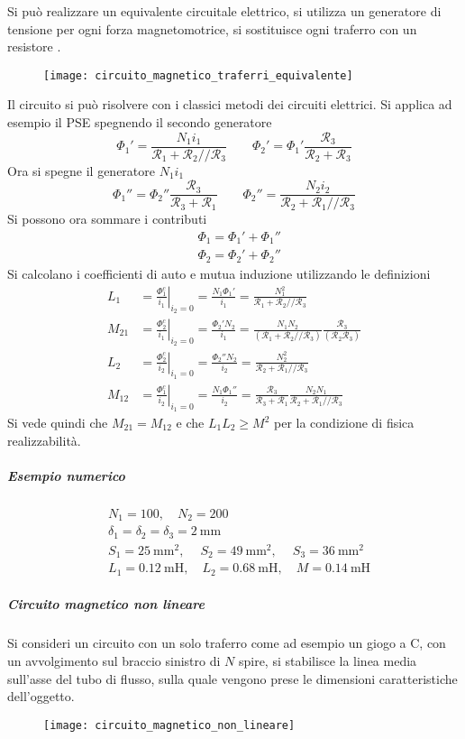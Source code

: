 Si può realizzare un equivalente circuitale elettrico, si utilizza un generatore
di tensione per ogni forza magnetomotrice, si sostituisce ogni traferro con un resistore
.
\begin{figure}[H]
\centering
\texttt{[image: circuito\_magnetico\_traferri\_equivalente]}
\end{figure}
Il circuito si può risolvere con i classici metodi dei circuiti elettrici.
Si applica ad esempio il PSE spegnendo il secondo generatore
$$
\Phi_1' = \frac{N_1i_1}{\mathcal{R}_1 + \mathcal{R}_2 // \mathcal{R}_3}
\qquad
\Phi_2' = \Phi_1' \frac{\mathcal{R}_3}{\mathcal{R}_2+\mathcal{R}_3}
$$
Ora si spegne il generatore $N_1i_1$
$$
\Phi_1'' = \Phi_2'' \frac{\mathcal{R}_3}{\mathcal{R}_3 + \mathcal{R}_1}
\qquad
\Phi_2'' = \frac{N_2i_2}{\mathcal{R}_2+\mathcal{R}_1//\mathcal{R}_3}
$$
Si possono ora sommare i contributi
\begin{align*}
&\Phi_1 = \Phi_1' + \Phi_1''\\
&\Phi_2 = \Phi_2' + \Phi_2''
\end{align*}
Si calcolano i coefficienti di auto e mutua induzione utilizzando le definizioni
\begin{align*}
L_1 &= \left.\frac{\Phi_1^c}{i_1}\right|_{i_2 = 0} = \frac{N_1\Phi_1'}{i_1} = \frac{N_1^2}{\mathcal{R}_1 + \mathcal{R}_2//\mathcal{R}_3}\\
M_{21} &= \left.\frac{\Phi_2^c}{i_1}\right|_{i_2 = 0} = \frac{\Phi_2' N_2}{i_1} =
\frac{N_1N_2}{(\mathcal{R}_1+\mathcal{R}_2//\mathcal{R}_3)}\frac{\mathcal{R}_3}{(\mathcal{R}_2\mathcal{R}_3)}\\
L_2 &= \left.\frac{\Phi_2^c}{i_2}\right|_{i_1 = 0} = \frac{\Phi_2''N_2}{i_2} = \frac{N_2^2}{\mathcal{R}_2+\mathcal{R}_1//\mathcal{R}_3}\\
M_{12} &= \left.\frac{\Phi_1^c}{i_2}\right|_{i_1 = 0} = \frac{N_1\Phi_1''}{i_2} = \frac{\mathcal{R}_3}{\mathcal{R}_3+\mathcal{R}_1}\frac{N_2N_1}{\mathcal{R}_2+\mathcal{R}_1//\mathcal{R}_3}
\end{align*}
Si vede quindi che $M_{21} = M_{12}$ e che $L_1L_2 \geq M^2$ per la condizione di fisica
realizzabilità.
\newpage
\subparagraph{Esempio numerico}
\begin{align*}
&N_1 = 100, \quad N_2 = 200\\
&\delta_1 = \delta_2=\delta_3 = \SI{2}{\milli\meter} \\
& S_1 = \SI{25}{\milli\meter^2},\quad\ S_2 = \SI{49}{\milli\meter^2},\quad\ S_3 = \SI{36}{\milli\meter^2}\\
&L_1 = \SI{0.12}{\milli\henry},\quad L_2 = \SI{0.68}{\milli\henry}, \quad  M = \SI{0.14}{\milli\henry}
\end{align*}
\subparagraph{Circuito magnetico non lineare}
Si consideri un circuito con un solo traferro come ad esempio un giogo a C, con un avvolgimento sul braccio sinistro di $N$ spire, si stabilisce la linea media sull'asse
del tubo di flusso, sulla quale vengono prese le dimensioni caratteristiche dell'oggetto.
\begin{figure}[H]
\centering
\texttt{[image: circuito\_magnetico\_non\_lineare]}
\end{figure}

